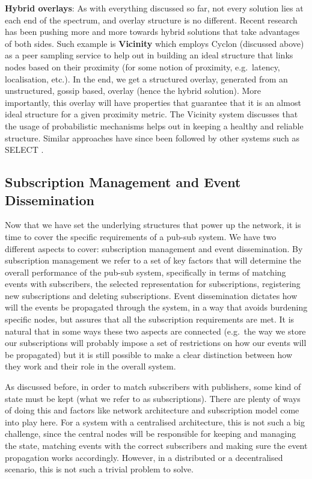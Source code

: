 \textbf{Hybrid overlays}: As with everything discussed so far, not every
solution lies at each end of the spectrum, and overlay structure is no
different. Recent research has been pushing more and more towards hybrid
solutions that take advantages of both sides. Such example is \textbf{Vicinity}
\cite{Voulgaris2013} which employs Cyclon (discussed above) as a peer sampling
service to help out in building an ideal structure that links nodes based on
their proximity (for some notion of proximity, e.g.~latency, localisation,
etc.). In the end, we get a structured overlay, generated from an unstructured,
gossip based, overlay (hence the hybrid solution). More importantly, this
overlay will have properties that guarantee that it is an almost ideal
structure for a given proximity metric. The Vicinity system discusses that the
usage of probabilistic mechanisms helps out in keeping a healthy and reliable
structure. Similar approaches have since been followed by other systems such as
SELECT \cite{Apolonia2018}.

\subsection{Subscription Management and Event
Dissemination}\label{subscription-management-and-event-dissemination}

Now that we have set the underlying structures that power up the
network, it is time to cover the specific requirements of a pub-sub
system. We have two different aspects to cover: subscription management
and event dissemination. By subscription management we refer to a set of
key factors that will determine the overall performance of the pub-sub
system, specifically in terms of matching events with subscribers, the
selected representation for subscriptions, registering new subscriptions
and deleting subscriptions. Event dissemination dictates how will the
events be propagated through the system, in a way that avoids burdening
specific nodes, but assures that all the subscription requirements are
met. It is natural that in some ways these two aspects are connected
(e.g.~the way we store our subscriptions will probably impose a set of
restrictions on how our events will be propagated) but it is still
possible to make a clear distinction between how they work and their
role in the overall system.

As discussed before, in order to match subscribers with publishers, some
kind of state must be kept (what we refer to as subscriptions). There are
plenty of ways of doing this and factors like network architecture and
subscription model come into play here. For a system with a centralised
architecture, this is not such a big challenge, since the central nodes
will be responsible for keeping and managing the state, matching events
with the correct subscribers and making sure the event propagation works
accordingly. However, in a distributed or a decentralised scenario, this
is not such a trivial problem to solve.


